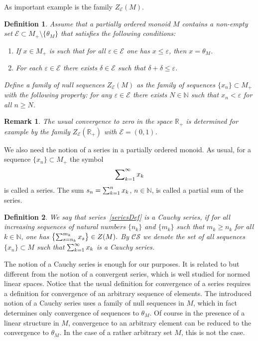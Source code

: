 \documentclass[12pt]{amsart}          %
\newtheorem{definition}{Definition}
\newtheorem{remark}{Remark}
\newcommand{\RR}{\mathbb R}
\newcommand{\NN}{\mathbb N}
\newcommand{\EE}{\mathcal{E}}
\begin{document}
 As important example is the family $Z_{\EE}(M)$.
 \begin{definition}\label{def::solidM+}
    Assume that a partially ordered monoid $M$ contains a non-empty set $\mathcal{E}\subset  M_+\setminus \{ \theta_M \}$ that satisfies the following conditions:
    \begin{enumerate}
        \item If $x\in M_+$ is such that for all $\varepsilon\in \mathcal{E}$ one has $x\le \varepsilon$, then $x=\theta_M$.
    \item For each $\varepsilon\in \mathcal{E}$ there exists $\delta\in \mathcal{E}$ such that $\delta + \delta \leq \varepsilon$.
    \end{enumerate}
Define a family of null sequences $Z_{\EE}(M)$ as the family of sequences  $\{x_n\}\subset M_+$ with the following property:  
for any $\varepsilon\in \mathcal{E}$ there  exists $N \in \NN$ such that  $x_n < \varepsilon$ for all $n\geq N$.

\end{definition}


{
\begin{remark}\label{r::realNullSeqs}
The usual convergence to zero in the space $\RR_+$ is determined for example by the family $Z_{\EE}(\RR_+)$ with $\EE = (0,1)$.
\end{remark}
}

We also need the notion of a series in a partially ordered monoid. As usual, for a sequence $\{x_n\}\subset M_+$ the symbol 
\begin{equation}\label{seriesDef}
 \sum\nolimits\nolimits\nolimits_{k=1}^\infty x_k
\end{equation}
is called a series. The sum $s_n=\sum\nolimits\nolimits_{k=1}^nx_k$, $n\in \NN$, is called a partial sum of the series.

\begin{definition}\label{def::CauchySeries}
We say that series~\eqref{seriesDef} is a Cauchy series, 
if for all increasing sequences of natural numbers $\{n_k\}$ and $\{m_k\}$ such that $m_k\geq n_k$ for all $k\in\NN$, one has
$
\left\{\sum\nolimits\nolimits_{s=n_k}^{m_k} x_s\right\} \in Z(M).
$
By $\mathcal{CS}$ we denote the set of all sequences $\{x_n\}\subset M$ such that $\sum\nolimits\nolimits_{k=1}^\infty x_k$ is a Cauchy series.
\end{definition}
The notion of a Cauchy series is enough for our purposes. It is related to but different from the notion of a convergent series, which is well studied for normed linear spaces. Notice that the usual definition for convergence of a series requires a definition for convergence of an arbitrary sequence of elements. The introduced notion of a Cauchy series uses a family of null sequences in $M$, which in fact determines only convergence of sequences to $\theta_M$. Of course in the presence of a linear structure in $M$, convergence to an arbitrary element can be reduced to the convergence to $\theta_M$. In the case of a rather arbitrary set $M$, this is not the case.
\end{document}
